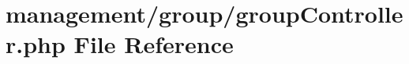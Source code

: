 \hypertarget{group_controller_8php}{}\section{management/group/group\+Controller.php File Reference}
\label{group_controller_8php}
